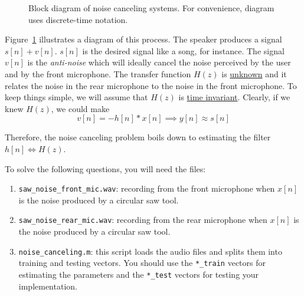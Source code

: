 \documentclass[10pt]{article}
\begin{document}
\FloatBarrier
\begin{figure}[h!]
	\centering
	\resizebox{0.7\textwidth}{!}{}
	\caption{Block diagram of noise canceling systems. For convenience, diagram uses discrete-time notation.}
	\label{fig:noise_cancelling_diagram1}
\end{figure}
\FloatBarrier

Figure~\ref{fig:noise_cancelling_diagram1} illustrates a diagram of this process. The speaker produces a signal $s[n] + v[n]$. $s[n]$ is the desired signal like a song, for instance. The signal $v[n]$ is the \textit{anti-noise} which will ideally cancel the noise perceived by the user and by the front microphone. The transfer function $H(z)$ is \underline{unknown} and it relates the noise in the rear microphone to the noise in the front microphone. To keep things simple, we will assume that $H(z)$ is \underline{time invariant}. Clearly, if we knew $H(z)$, we could make 
\begin{equation} \label{eq:v}
	v[n] = -h[n]\ast x[n] \implies y[n] \approx s[n]
\end{equation}

Therefore, the noise canceling problem boils down to estimating the filter $h[n] \Longleftrightarrow H(z)$.

To solve the following questions, you will need the files:

\begin{enumerate}
	\item \texttt{saw\_noise\_front\_mic.wav}: recording from the front microphone when $x[n]$ is the noise produced by a circular saw tool.
	\item \texttt{saw\_noise\_rear\_mic.wav}: recording from the rear microphone when $x[n]$ is the noise produced by a circular saw tool.
	\item \texttt{noise\_canceling.m}: this script loads the audio files and splits them into training and testing vectors. You should use the \texttt{*\_train} vectors for estimating the parameters and the \texttt{*\_test} vectors for testing your implementation.
\end{enumerate}
\end{document}
